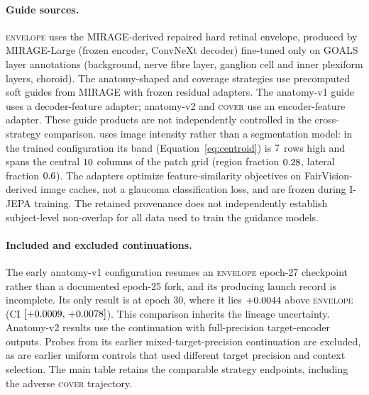 \paragraph{Guide sources.}
\textsc{envelope} uses the MIRAGE-derived repaired hard retinal envelope,
produced by MIRAGE-Large (frozen encoder, ConvNeXt decoder) fine-tuned only on
GOALS layer annotations (background, nerve fibre layer, ganglion cell and inner
plexiform layers, choroid). The anatomy-shaped and coverage strategies use
precomputed soft guides from
MIRAGE with frozen residual adapters. The anatomy-v1 guide uses a
decoder-feature adapter; anatomy-v2 and \textsc{cover} use an encoder-feature
adapter. These guide products are not independently controlled in the
cross-strategy comparison. \ArmBest{} uses image intensity rather than a
segmentation model: in the trained configuration its band
(Equation~\ref{eq:centroid}) is $7$ rows high and spans the central
$10$ columns of the patch grid (region fraction $0.28$,
lateral fraction $0.6$).
The adapters optimize feature-similarity objectives on FairVision-derived
image caches, not a glaucoma classification loss, and are frozen during
I-JEPA training. The retained provenance does not independently establish
subject-level non-overlap for all data used to train the guidance models.

\paragraph{Included and excluded continuations.}
\label{app:excluded}
The early anatomy-v1 configuration resumes an \textsc{envelope} epoch-27
checkpoint rather than a documented epoch-25 fork, and its producing launch record
is incomplete. Its only result is at epoch 30, where it lies
$+0.0044$ above \textsc{envelope} (CI
$[+0.0009,\,+0.0078]$). This comparison inherits the lineage
uncertainty.
Anatomy-v2 results use the continuation with full-precision target-encoder
outputs. Probes from its earlier mixed-target-precision continuation are
excluded, as are earlier uniform controls that used different target
precision and context selection. The main table retains the comparable
strategy endpoints, including the adverse \textsc{cover} trajectory.

